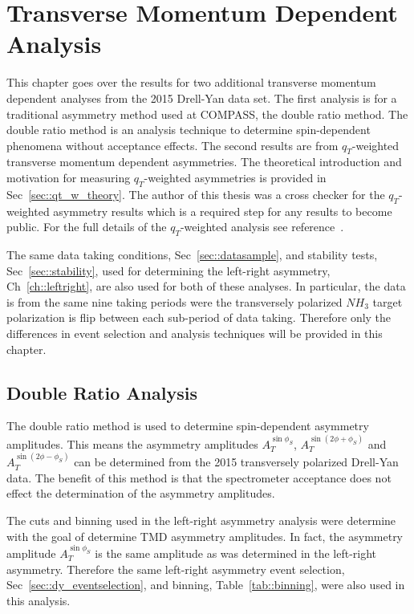 \chapter{Transverse Momentum Dependent Analysis} \label{ch::tmdanalysis}
\ifpdf
\graphicspath{{Chapters/TMDAnalysis/Figs/}}
\fi

This chapter goes over the results for two additional transverse momentum
dependent analyses from the 2015 Drell-Yan data set.  The first analysis is for
a traditional asymmetry method used at COMPASS, the double ratio method.  The
double ratio method is an analysis technique to determine spin-dependent
phenomena without acceptance effects.  The second results are from
$q_T$-weighted transverse momentum dependent asymmetries. The theoretical
introduction and motivation for measuring $q_T$-weighted asymmetries is provided
in Sec~\ref{sec::qt_w_theory}.  The author of this thesis was a cross checker
for the $q_T$-weighted asymmetry results which is a required step for any
results to become public.  For the full details of the $q_T$-weighted analysis
see reference~\cite{janthesis}.

The same data taking conditions, Sec~\ref{sec::datasample}, and stability tests,
Sec~\ref{sec::stability}, used for determining the left-right asymmetry,
Ch~\ref{ch::leftright}, are also used for both of these analyses.  In
particular, the data is from the same nine taking periods were the transversely
polarized $NH_3$ target polarization is flip between each sub-period of data
taking.  Therefore only the differences in event selection and analysis
techniques will be provided in this chapter.

\section{Double Ratio Analysis} \label{sec::doubleratio}
The double ratio method is used to determine spin-dependent asymmetry
amplitudes.  This means the asymmetry amplitudes $A^{\sin\phi_S}_T$,
$A^{\sin(2\phi+\phi_S)}_T$ and $A^{\sin(2\phi-\phi_S)}_T$ can be determined from
the 2015 transversely polarized Drell-Yan data.  The benefit of this method is
that the spectrometer acceptance does not effect the determination of the
asymmetry amplitudes.

The cuts and binning used in the left-right asymmetry analysis were determine
with the goal of determine TMD asymmetry amplitudes.  In fact, the asymmetry
amplitude $A^{\sin\phi_S}_T$ is the same amplitude as was determined in the
left-right asymmetry.  Therefore the same left-right asymmetry event selection,
Sec~\ref{sec::dy_eventselection}, and binning, Table~\ref{tab::binning}, were
also used in this analysis.


